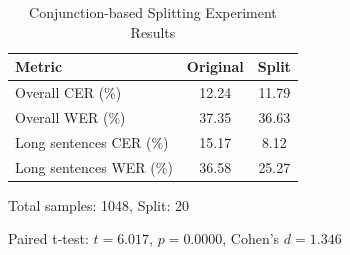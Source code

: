 \begin{table}[h]
\centering
\caption{Conjunction-based Splitting Experiment Results}
\label{tab:split_experiment}
\begin{tabular}{lcc}
\toprule
\textbf{Metric} & \textbf{Original} & \textbf{Split} \\
\midrule
Overall CER (\%) & 12.24 & 11.79 \\
Overall WER (\%) & 37.35 & 36.63 \\
\midrule
Long sentences CER (\%) & 15.17 & 8.12 \\
Long sentences WER (\%) & 36.58 & 25.27 \\
\bottomrule
\end{tabular}

\vspace{0.5em}
\footnotesize{Total samples: 1048, Split: 20}

\footnotesize{Paired t-test: $t = 6.017$, $p = 0.0000$, Cohen's $d = 1.346$}
\end{table}
